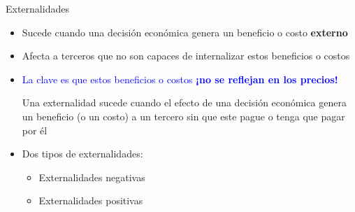 \documentclass{beamer}
\begin{document}
\begin{frame}{Externalidades}
    \begin{itemize}
        \item Sucede cuando una decisión económica genera un beneficio o costo \textbf{externo}
        \item Afecta a terceros que no son capaces de internalizar estos beneficios o costos
        \item \textcolor{blue}{La clave es que estos beneficios o costos \textbf{¡no se reflejan en los precios!}}
        \begin{boxB}
            \centering
            Una externalidad sucede cuando el efecto de una decisión económica genera un beneficio (o un costo) a un tercero sin que este pague o tenga que pagar por él
        \end{boxB}
        \item Dos tipos de externalidades: 
        \begin{itemize}
            \item Externalidades negativas
            \item Externalidades positivas
        \end{itemize}
    \end{itemize}
\end{frame}

\end{document}
